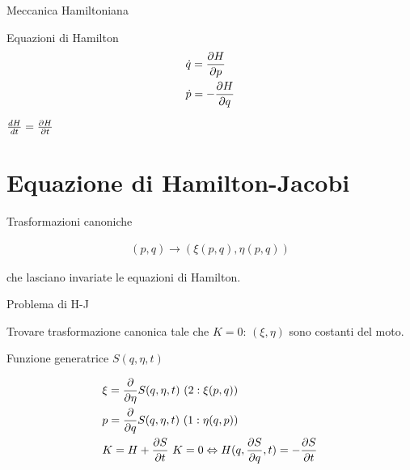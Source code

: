 \begin{wordonframe}{Meccanica Hamiltoniana}

\begin{block}{Equazioni di Hamilton}
\begin{align*}
&\dot{q}=\PDy{p}{H}\\
&\dot{p}=-\PDy{q}{H}
\end{align*}
\end{block}

$\TDy{t}{H}=\PDy{t}{H}$

\end{wordonframe}


\section{Equazione di Hamilton-Jacobi}

\begin{block}{Trasformazioni canoniche}

\begin{align*}
(p,q)\to(\xi(p,q),\eta(p,q))
\end{align*}

che lasciano invariate le equazioni di Hamilton.

\end{block}

\begin{block}{Problema di H-J}

Trovare trasformazione canonica tale che $K=0$: $(\xi,\eta)$ sono costanti del moto.

\end{block}

\begin{block}{Funzione generatrice $S(q,\eta,t)$}

\begin{align*}
&\xi=\PDof{\eta}S(q,\eta,t)\ (2: \xi(p,q))\\
&p=\PDof{q}S(q,\eta,t)\ (1:\eta(q,p))\\
&K=H+\PDy{t}{S}\ K=0\Leftrightarrow H(q,\PDy{q}{S},t)=-\PDy{t}{S}
\end{align*}


\end{block}

